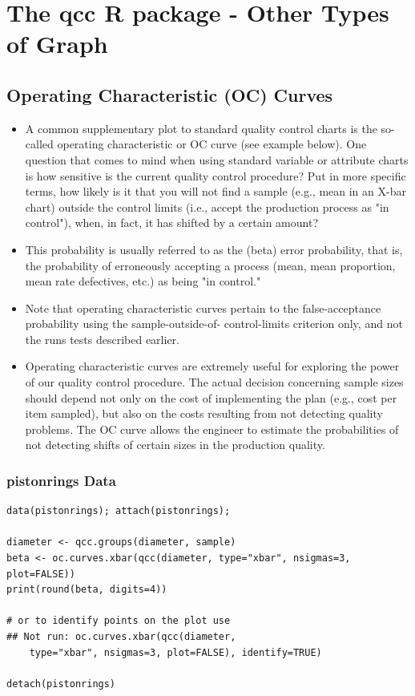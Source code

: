 \documentclass[]{article}
\begin{document}
\section{The \textbf{qcc} R package - Other Types of Graph}


\subsection{Operating Characteristic (OC) Curves}
\begin{itemize}
\item A common supplementary plot to standard quality control charts is the so-called operating characteristic or OC curve (see example below). One question that comes to mind when using standard variable or attribute charts is how sensitive is the current quality control procedure? Put in more specific terms, how likely is it that you will not find a sample (e.g., mean in an X-bar chart) outside the control limits (i.e., accept the production process as "in control"), when, in fact, it has shifted by a certain amount? 

\item This probability is usually referred to as the  (beta) error probability, that is, the probability of erroneously accepting a process (mean, mean proportion, mean rate defectives, etc.) as being "in control." 

\item Note that operating characteristic curves pertain to the false-acceptance probability using the sample-outside-of- control-limits criterion only, and not the runs tests described earlier.


\item Operating characteristic curves are extremely useful for exploring the power of our quality control procedure. The actual decision concerning sample sizes should depend not only on the cost of implementing the plan (e.g., cost per item sampled), but also on the costs resulting from not detecting quality problems. The OC curve allows the engineer to estimate the probabilities of not detecting shifts of certain sizes in the production quality.
\end{itemize}






\newpage
\subsubsection{pistonrings Data}
\begin{framed}
\begin{verbatim}
data(pistonrings); attach(pistonrings);

diameter <- qcc.groups(diameter, sample)
beta <- oc.curves.xbar(qcc(diameter, type="xbar", nsigmas=3, plot=FALSE))
print(round(beta, digits=4))

# or to identify points on the plot use
## Not run: oc.curves.xbar(qcc(diameter, 
    type="xbar", nsigmas=3, plot=FALSE), identify=TRUE)

detach(pistonrings)
\end{verbatim}
\end{framed}
\end{document}
